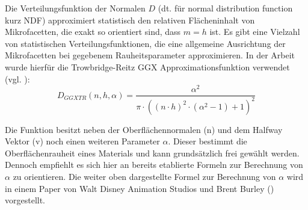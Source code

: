 \documentclass[
  11pt,
  a4paper,
  oneside
  ]{article}
\begin{document}
Die Verteilungsfunktion der Normalen $D$ (dt. für normal distribution function kurz NDF) approximiert statistisch den relativen Flächeninhalt von Mikrofacetten, die exakt so orientiert sind, dass $m = h$ ist. Es gibt eine Vielzahl von statistischen Verteilungsfunktionen, die eine allgemeine Ausrichtung der Mikrofacetten bei gegebenem Rauheitsparameter approximieren. In der Arbeit wurde hierfür die Trowbridge-Reitz GGX Approximationsfunktion verwendet (vgl. \cite{learnOpenGL}):
\begin{equation}
  D_{GGXTR}\left( n,h,\alpha \right) =\dfrac{\alpha ^{2}}{\pi \cdot \left( \left( n\cdot h\right) ^{2}\cdot \left( \alpha ^{2}-1\right) +1\right) ^{2}}
\end{equation}

Die Funktion besitzt neben der Oberflächennormalen (n) und dem Halfway Vektor (v) noch einen weiteren Parameter $\alpha$. Dieser bestimmt die Oberflächenrauheit eines Materials und kann grundsätzlich frei gewählt werden. Dennoch empfiehlt es sich hier an bereits etablierte Formeln zur Berechnung von $\alpha$ zu orientieren. Die weiter oben dargestellte Formel zur Berechnung von $\alpha$ wird in einem Paper von Walt Disney Animation Studios und Brent Burley (\cite{Burley2012PhysicallyBasedSA}) vorgestellt.
\end{document}

